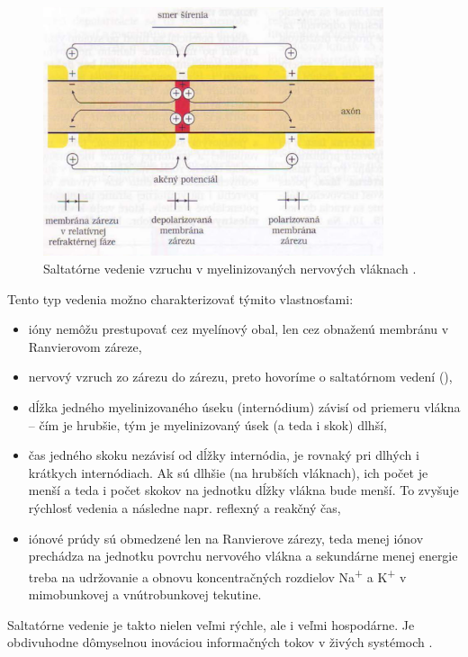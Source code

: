\begin{figure}[!htbp]
  \centering
  \includegraphics[width=10cm]{img/myelin.png}
  \caption{Saltatórne vedenie vzruchu v myelinizovaných nervových vláknach \cite{javorkaLekarskaFyziologiaUcebnica2001}.}
  \label{myelin}
\end{figure}	

Tento typ vedenia možno charakterizovať týmito vlastnosťami: 
\begin{itemize}
  \item ióny nemôžu prestupovať cez myelínový obal, len cez obnaženú membránu v Ranvierovom záreze,
  \item nervový vzruch  zo zárezu do zárezu, preto hovoríme o saltatórnom vedení (),
  \item dĺžka jedného myelinizovaného úseku (internódium) závisí od priemeru vlákna {--} čím je hrubšie, tým je myelinizovaný úsek (a teda i skok) dlhší,
  \item čas jedného skoku nezávisí od dĺžky internódia, je rovnaký pri dlhých i krátkych internódiach. Ak sú dlhšie (na hrubších vláknach), ich počet je menší a teda i počet skokov na jednotku dĺžky vlákna bude menší. To zvyšuje rýchlosť vedenia a následne napr. reflexný a reakčný čas,
  \item iónové prúdy sú obmedzené len na Ranvierove zárezy, teda menej iónov prechádza na jednotku povrchu nervového vlákna a sekundárne menej energie treba na udržovanie a obnovu koncentračných rozdielov Na\textsuperscript{+} a K\textsuperscript{+} v mimobunkovej a vnútrobunkovej tekutine.
\end{itemize}

Saltatórne vedenie je takto nielen veľmi rýchle, ale i veľmi hospodárne. Je obdivuhodne dômyselnou inováciou informačných tokov v živých systémoch \cite{bederFyziologiaCloveka2005}.

